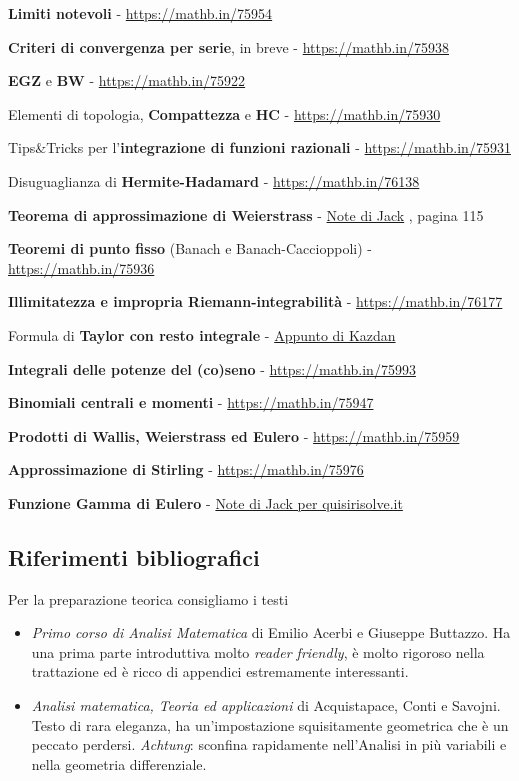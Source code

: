 \documentclass[a4paper,twoside]{article}
\theoremstyle{definition}
\numberwithin{theorem}{section}
\begin{document}
\textbf{Limiti notevoli} - \url{https://mathb.in/75954}

\textbf{Criteri di convergenza per serie}, in breve - \url{https://mathb.in/75938}

\textbf{EGZ} e \textbf{BW} - \url{https://mathb.in/75922}

Elementi di topologia, \textbf{Compattezza} e \textbf{HC} - \url{https://mathb.in/75930}

Tips\&Tricks per l'\textbf{integrazione di funzioni razionali} - \url{https://mathb.in/75931}

Disuguaglianza di \textbf{Hermite-Hadamard} - \url{https://mathb.in/76138}

\textbf{Teorema di approssimazione di Weierstrass} - \href{https://drive.google.com/file/d/1QKCejQNSohMTlZs-MPRndxo5tJ8H48Ez/view?usp=sharing}{Note di Jack} , pagina 115

\textbf{Teoremi di punto fisso} (Banach e Banach-Caccioppoli) - \url{https://mathb.in/75936}

\textbf{Illimitatezza e impropria Riemann-integrabilità} - \url{https://mathb.in/76177}

Formula di \textbf{Taylor con resto integrale} - \href{https://www2.math.upenn.edu/~kazdan/361F15/Notes/Taylor-integral.pdf}{Appunto di Kazdan}

\textbf{Integrali delle potenze del (co)seno} - \url{https://mathb.in/75993}

\textbf{Binomiali centrali e momenti} - \url{https://mathb.in/75947}

\textbf{Prodotti di Wallis, Weierstrass ed Eulero} - \url{https://mathb.in/75959}

\textbf{Approssimazione di Stirling} - \url{https://mathb.in/75976}

\textbf{Funzione Gamma di Eulero} - \href{https://quisirisolve.com/analisi-matematica/funzioni-speciali/funzione-gamma-di-eulero/teoria-ed-esercizi-sulla-funzione-gamma-di-eulero/}{Note di Jack per quisirisolve.it}


\subsection{Riferimenti bibliografici}

Per la preparazione teorica consigliamo i testi
\begin{itemize}
 \item \emph{Primo corso di Analisi Matematica} di Emilio Acerbi e Giuseppe Buttazzo. Ha una prima parte introduttiva molto \emph{reader friendly}, è molto rigoroso nella trattazione ed è ricco di appendici estremamente interessanti.
 \item \emph{Analisi matematica, Teoria ed applicazioni} di Acquistapace, Conti e Savojni. Testo di rara eleganza, ha un'impostazione squisitamente geometrica che è un peccato perdersi. \emph{Achtung}: sconfina rapidamente nell'Analisi in più variabili e nella geometria differenziale.
\end{itemize}
\end{document}
